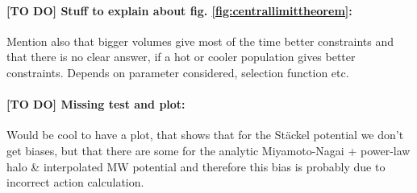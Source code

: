  \paragraph{[TO DO] Stuff to explain about fig. \ref{fig:centrallimittheorem}:} Mention also that bigger volumes give most of the time better constraints and that there is no clear answer, if a hot or cooler population gives better constraints. Depends on parameter considered, selection function etc.


\paragraph{[TO DO] Missing test and plot:}  Would be cool to have a plot, that shows that for the St\"ackel potential we don't get biases, but that there are some for the analytic Miyamoto-Nagai + power-law halo \& interpolated MW potential and therefore this bias is probably due to incorrect action calculation.

